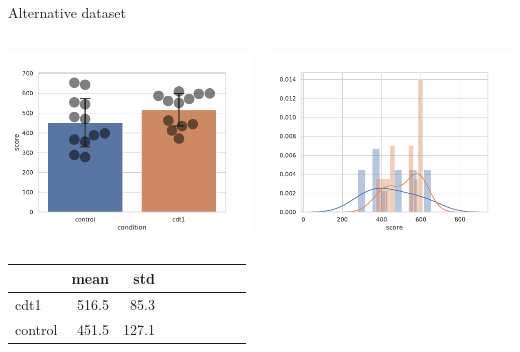 \documentclass[compress]{beamer}
\begin{document}
\begin{frame}{Alternative dataset}

    \begin{columns}
        \begin{column}{0.5\linewidth}

            \includegraphics[width=\columnwidth]{code/dataset2-cdts.pdf}
        \end{column}
        \begin{column}{0.5\linewidth}
            \includegraphics[width=\columnwidth]{code/distributions2.pdf}

        \end{column}
    \end{columns}

    \begin{center}
        \begin{tabular}{lrrrrrrrr}
            \toprule
            {} &  mean &         std\\ \midrule
            cdt1      &   516.5 & 85.3 \\
            control   &   451.5 & 127.1\\
            \bottomrule
        \end{tabular}
    \end{center}

\end{frame}
\end{document}
